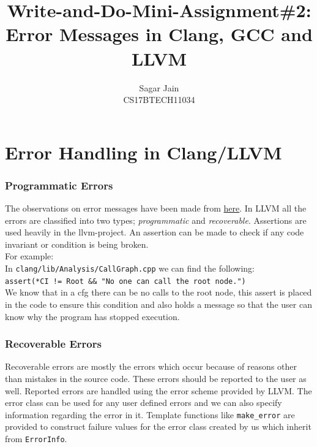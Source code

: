 \documentclass[12pt]{article}
\newcommand{\code}{\texttt}
\begin{document}
\title{Write-and-Do-Mini-Assignment\#2: Error Messages in Clang, GCC and LLVM}
\author{Sagar Jain\\CS17BTECH11034}
\maketitle
\section*{Error Handling in Clang/LLVM}
\subsubsection*{Programmatic Errors}
The observations on error messages have been made from \href{http://llvm.org/docs/ProgrammersManual.html}{here}.
In LLVM all the errors are classified into two types; \textit{programmatic} and \textit{recoverable}. Assertions are used heavily in the llvm-project. An assertion can be made to check if any code invariant or condition is being broken.\\
For example:\\
In \code{clang/lib/Analysis/CallGraph.cpp} we can find the following:\\
\hspace*{5ex} \code{assert(*CI != Root \&\& "No one can call the root node.")}
\\ We know that in a cfg there can be no calls to the root node, this assert is placed in the code to ensure this condition and also holds a message so that the user can know why the program has stopped execution.
\subsubsection*{Recoverable Errors}
Recoverable errors are mostly the errors which occur because of reasons other than mistakes in the source code. These errors should be reported to the user as well. Reported errors are handled using the error scheme provided by LLVM. The error class can be used for any user defined errors and we can also specify information regarding the error in it. Template functions like \code{make\_error} are provided to construct failure values for the error class created by us which inherit from \code{ErrorInfo}.
\end{document}
